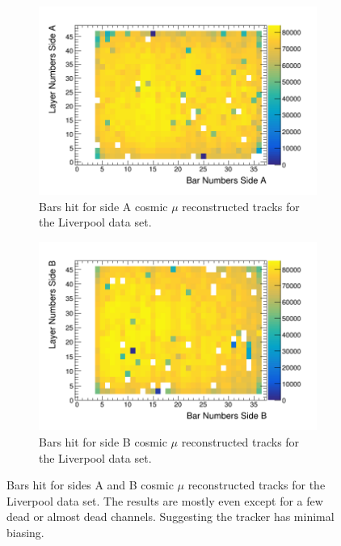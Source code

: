 \begin{figure}[!h]
\centering
\begin{subfigure}{.5\textwidth}
  \centering
  \includegraphics[width=\linewidth]{Chapter5/Figs/wylfaRasterNew/liverpoolSideAHits.png}
  \captionsetup{width=.9\linewidth}
  \caption{Bars hit for side A cosmic $\mu$ reconstructed tracks for the Liverpool data set.}
  \label{subFig:liverpoolSideAHits}
\end{subfigure}%
\begin{subfigure}{.5\textwidth}
  \centering
\includegraphics[width=\linewidth]{Chapter5/Figs/wylfaRasterNew/liverpoolSideBHits.png}
  \captionsetup{width=.9\linewidth}
  \caption{Bars hit for side B cosmic $\mu$ reconstructed tracks for the Liverpool data set.}
  \label{subFig:liverpoolSideBHits}
\end{subfigure}
\caption{Bars hit for sides A and B cosmic $\mu$ reconstructed tracks for the Liverpool data set. The results are mostly even except for a few dead or almost dead channels. Suggesting the tracker has minimal biasing.}
\label{fig:liverpoolSideABHits}
\end{figure}

